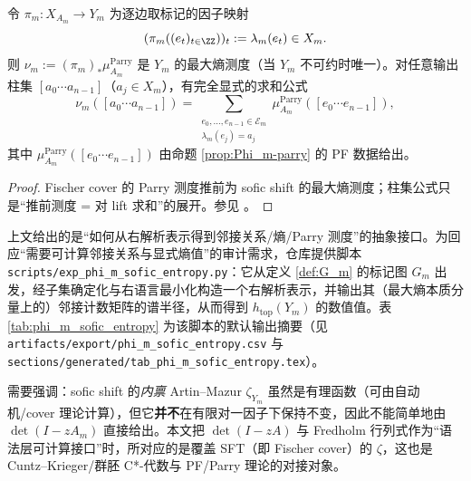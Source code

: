 \begin{proposition}\label{prop:Phi_m-parry-pushforward}
令 $\pi_m:X_{A_m}\to Y_m$ 为逐边取标记的因子映射
\[
(\pi_m((e_t)_{t\in\ZZ}))_t:=\lambda_m(e_t)\in X_m.
\]
则 $\nu_m:=({\pi_m})_*\mu_{A_m}^{\mathrm{Parry}}$ 是 $Y_m$ 的最大熵测度（当 $Y_m$ 不可约时唯一）。对任意输出柱集 $[a_0\cdots a_{n-1}]$（$a_j\in X_m$），有完全显式的求和公式
\[
\nu_m([a_0\cdots a_{n-1}])
=
\sum_{\substack{e_0,\dots,e_{n-1}\in\mathcal{E}_m\\ \lambda_m(e_j)=a_j}}
\mu_{A_m}^{\mathrm{Parry}}([e_0\cdots e_{n-1}]),
\]
其中 $\mu_{A_m}^{\mathrm{Parry}}([e_0\cdots e_{n-1}])$ 由命题 \ref{prop:Phi_m-parry} 的 PF 数据给出。
\end{proposition}

\begin{proof}
Fischer cover 的 Parry 测度推前为 sofic shift 的最大熵测度；柱集公式只是“推前测度 = 对 lift 求和”的展开。参见 \cite{LindMarcus1995,Kitchens1998SymbolicDynamics}。
\end{proof}

\begin{remark}[可复现的邻接关系与熵计算（脚本）]\label{rem:phi_m_entropy_script}
上文给出的是“如何从右解析表示得到邻接关系/熵/Parry 测度”的抽象接口。为回应“需要可计算邻接关系与显式熵值”的审计需求，仓库提供脚本 \texttt{scripts/exp\_phi\_m\_sofic\_entropy.py}：它从定义 \ref{def:G_m} 的标记图 $G_m$ 出发，经子集确定化与右语言最小化构造一个右解析表示，并输出其（最大熵本质分量上的）邻接计数矩阵的谱半径，从而得到 $h_{\mathrm{top}}(Y_m)$ 的数值值。表 \ref{tab:phi_m_sofic_entropy} 为该脚本的默认输出摘要（见 \texttt{artifacts/export/phi\_m\_sofic\_entropy.csv} 与 \texttt{sections/generated/tab\_phi\_m\_sofic\_entropy.tex}）。
\end{remark}



\begin{remark}\label{rem:sofic-zeta-vs-cover}
需要强调：sofic shift 的\emph{内禀} Artin--Mazur \(\zeta_{Y_m}\) 虽然是有理函数（可由自动机/cover 理论计算），但它\textbf{并不}在有限对一因子下保持不变，因此不能简单地由 \(\det(I-zA_m)\) 直接给出。本文把 \(\det(I-zA)\) 与 Fredholm 行列式作为“语法层可计算接口”时，所对应的是覆盖 SFT（即 Fischer cover）的 \(\zeta\)，这也是 Cuntz--Krieger/群胚 C*-代数与 PF/Parry 理论的对接对象。
\end{remark}
